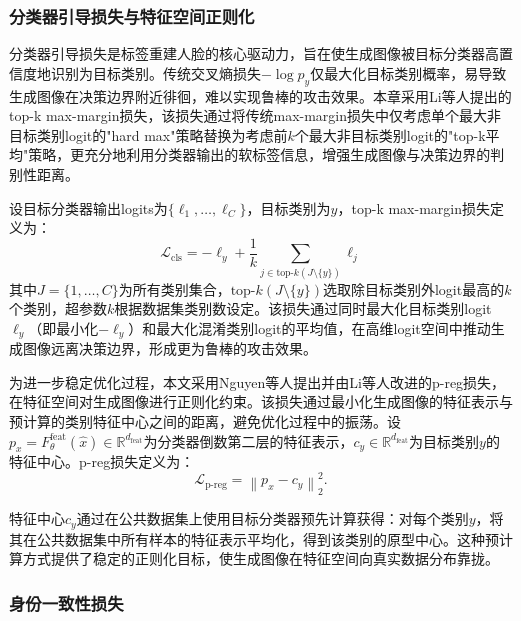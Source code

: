 \subsubsection{分类器引导损失与特征空间正则化}

分类器引导损失是标签重建人脸的核心驱动力，旨在使生成图像被目标分类器高置信度地识别为目标类别。传统交叉熵损失$-\log p_y$仅最大化目标类别概率，易导致生成图像在决策边界附近徘徊，难以实现鲁棒的攻击效果。本章采用Li等人\cite{li2024model}提出的top-k max-margin损失，该损失通过将传统max-margin损失\cite{carlini2017towards}中仅考虑单个最大非目标类别logit的"hard max"策略替换为考虑前$k$个最大非目标类别logit的"top-k平均"策略，更充分地利用分类器输出的软标签信息，增强生成图像与决策边界的判别性距离。

设目标分类器输出logits为$\{\ell_1, \ldots, \ell_C\}$，目标类别为$y$，top-k max-margin损失定义为：
\begin{equation}\label{eq:mia_topk_loss}
    \mathcal{L}_{\text{cls}} = -\ell_y + \frac{1}{k} \sum_{j \in \text{top-}k(J \setminus \{y\})} \ell_j
\end{equation}
其中$J = \{1, \ldots, C\}$为所有类别集合，$\text{top-}k(J \setminus \{y\})$选取除目标类别外logit最高的$k$个类别，超参数$k$根据数据集类别数设定。该损失通过同时最大化目标类别logit $\ell_y$（即最小化$-\ell_y$）和最大化混淆类别logit的平均值，在高维logit空间中推动生成图像远离决策边界，形成更为鲁棒的攻击效果。

为进一步稳定优化过程，本文采用Nguyen等人\cite{nguyen2023re}提出并由Li等人\cite{li2024model}改进的p-reg损失，在特征空间对生成图像进行正则化约束。该损失通过最小化生成图像的特征表示与预计算的类别特征中心之间的距离，避免优化过程中的振荡。设$p_x = F_\theta^{\text{feat}}(\hat{x}) \in \mathbb{R}^{d_{\text{feat}}}$为分类器倒数第二层的特征表示，$c_y \in \mathbb{R}^{d_{\text{feat}}}$为目标类别$y$的特征中心。p-reg损失定义为：
\begin{equation}\label{eq:mia_preg_loss}
    \mathcal{L}_{\text{p-reg}} = \left\|p_x - c_y\right\|_2^2.
\end{equation}

特征中心$c_y$通过在公共数据集上使用目标分类器预先计算获得：对每个类别$y$，将其在公共数据集中所有样本的特征表示平均化，得到该类别的原型中心。这种预计算方式提供了稳定的正则化目标，使生成图像在特征空间向真实数据分布靠拢。

\subsubsection{身份一致性损失}

